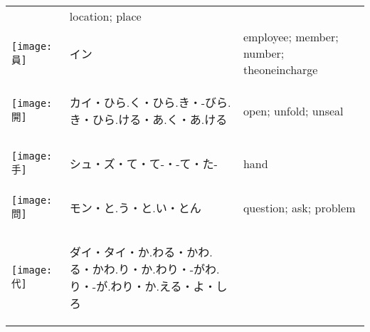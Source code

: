 \documentclass[a4paper,12pt]{extarticle}
\begin{document}
\begin{longtable}{|lp{6cm}p{4cm}|}
&
location; place
\\ 
\begin{minipage}{0.3\textwidth}
\centerline{
	\texttt{[image: 員]}
}
\end{minipage}
&
\begin{CJK}{UTF8}{min}イン\end{CJK}
&
employee; member; number; theoneincharge
\\ 
\begin{minipage}{0.3\textwidth}
\centerline{
	\texttt{[image: 開]}
}
\end{minipage}
&
\begin{CJK}{UTF8}{min}カイ・ひら.く・ひら.き・-びら.き・ひら.ける・あ.く・あ.ける\end{CJK}
&
open; unfold; unseal
\\ 
\begin{minipage}{0.3\textwidth}
\centerline{
	\texttt{[image: 手]}
}
\end{minipage}
&
\begin{CJK}{UTF8}{min}シュ・ズ・て・て-・-て・た-\end{CJK}
&
hand
\\ 
\begin{minipage}{0.3\textwidth}
\centerline{
	\texttt{[image: 問]}
}
\end{minipage}
&
\begin{CJK}{UTF8}{min}モン・と.う・と.い・とん\end{CJK}
&
question; ask; problem
\\ 
\begin{minipage}{0.3\textwidth}
\centerline{
	\texttt{[image: 代]}
}
\end{minipage}
&
\begin{CJK}{UTF8}{min}ダイ・タイ・か.わる・かわ.る・かわ.り・か.わり・-がわ.り・-が.わり・か.える・よ・しろ\end{CJK}

\end{longtable}
\end{document}
